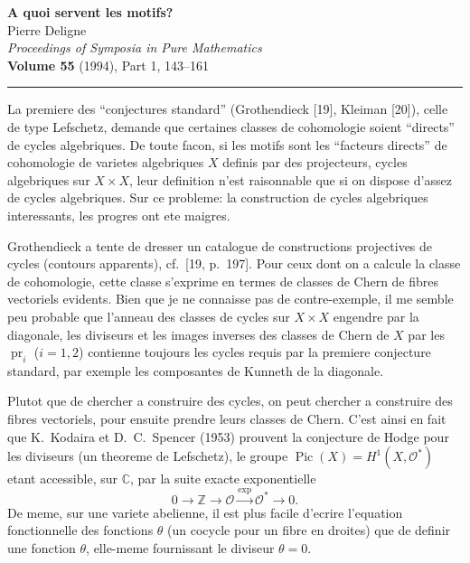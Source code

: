 \documentclass[11pt,a4paper]{article}
\theoremstyle{plain}
\theoremstyle{definition}
\DeclareMathOperator{\Pic}{Pic}
\DeclareMathOperator{\pr}{pr}
\newcommand{\Z}{\mathbb{Z}}
\newcommand{\C}{\mathbb{C}}
\begin{document}
\begin{center}
{\Large\textbf{A quoi servent les motifs?}}\\[1em]
{\large Pierre Deligne}\\[1em]
\textit{Proceedings of Symposia in Pure Mathematics}\\
\textbf{Volume 55} (1994), Part 1, 143--161
\end{center}

\vspace{1em}
\noindent\rule{\textwidth}{0.4pt}
\vspace{0.5em}

La premiere des ``conjectures standard'' (Grothendieck [19], Kleiman [20]),
celle de type Lefschetz, demande que certaines classes de cohomologie soient
``directs'' de cycles algebriques. De toute facon, si les motifs sont les ``facteurs
directs'' de cohomologie de varietes algebriques $X$ definis par des projecteurs, cycles algebriques sur
$X \times X$, leur definition n'est raisonnable que si on dispose d'assez de cycles
algebriques. Sur ce probleme: la construction de cycles algebriques
interessants, les progres ont ete maigres.

Grothendieck a tente de dresser un catalogue de constructions projectives de
cycles (contours apparents), cf.~[19, p.~197]. Pour ceux dont on a calcule la
classe de cohomologie, cette classe s'exprime en termes de classes de Chern de
fibres vectoriels evidents. Bien que je ne connaisse pas de contre-exemple, il me
semble peu probable que l'anneau des classes de cycles sur $X \times X$ engendre
par la diagonale, les diviseurs et les images inverses des classes de Chern de $X$
par les $\pr_i$ ($i = 1, 2$) contienne toujours les cycles requis par la premiere
conjecture standard, par exemple les composantes de Kunneth de la diagonale.

Plutot que de chercher a construire des cycles, on peut chercher a construire
des fibres vectoriels, pour ensuite prendre leurs classes de Chern. C'est ainsi
en fait que K.~Kodaira et D.~C.~Spencer (1953) prouvent la conjecture de
Hodge pour les diviseurs (un theoreme de Lefschetz), le groupe $\Pic(X) =
H^1(X, \mathcal{O}^*)$ etant accessible, sur $\C$, par la suite exacte exponentielle
$$
0 \to \Z \to \mathcal{O} \xrightarrow{\exp} \mathcal{O}^* \to 0.
$$
De meme, sur une variete abelienne, il est plus facile d'ecrire l'equation fonctionnelle des fonctions $\theta$ (un cocycle pour un fibre en droites) que de definir une fonction $\theta$, elle-meme fournissant le diviseur $\theta = 0$.
\end{document}
